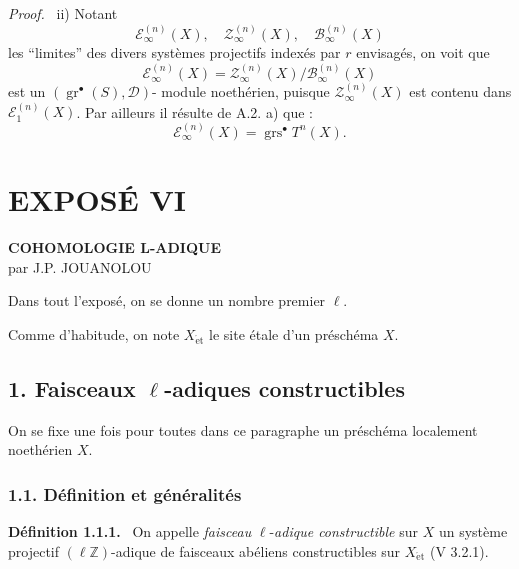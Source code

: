 \documentclass[11pt]{article}
\newenvironment{statement}[1]{\par\medskip\noindent\textbf{#1.}\ }{\par\medskip}
\newenvironment{prooftext}[1][Proof]{\par\noindent\emph{#1.}\ }{\par\medskip}
\providecommand{\gr}{\operatorname{gr}}
\providecommand{\gr}{\operatorname{gr}}
\providecommand{\gr}{\operatorname{gr}}
\providecommand{\grs}{\operatorname{grs}}
\begin{document}
\begin{prooftext}
ii) Notant
\[
\mathcal E_\infty^{(n)}(X),\quad
\mathcal Z_\infty^{(n)}(X),\quad
\mathcal B_\infty^{(n)}(X)
\]
les ``limites'' des divers systèmes projectifs indexés par \(r\) envisagés, on voit que
\[
\mathcal E_\infty^{(n)}(X)=
\mathcal Z_\infty^{(n)}(X)/\mathcal B_\infty^{(n)}(X)
\]
est un \((\gr^\bullet(S),\mathcal D)\)-
module noethérien, puisque \(\mathcal Z_\infty^{(n)}(X)\) est contenu dans \(\mathcal E_1^{(n)}(X)\). Par ailleurs il résulte de A.2. a) que :
\[
\mathcal E_\infty^{(n)}(X)=\grs^\bullet T^n(X).
\]
\end{prooftext}

\renewenvironment{prooftext}[1][Proof]{\par\noindent\emph{#1.}\ }{\par\medskip}
\section*{EXPOSÉ VI}

\begin{center}
\textbf{COHOMOLOGIE L-ADIQUE}\\[0.5em]
par J.P. JOUANOLOU
\end{center}

Dans tout l'exposé, on se donne un nombre premier \(\ell\).

Comme d'habitude, on note \(X_{\mathrm{\acute et}}\) le site étale d'un préschéma \(X\).

\subsection*{1. Faisceaux \(\ell\)-adiques constructibles}

On se fixe une fois pour toutes dans ce paragraphe un préschéma localement noethérien \(X\).

\subsubsection*{1.1. Définition et généralités}

\begin{statement}{Définition 1.1.1}
On appelle \emph{faisceau} \(\ell\)-\emph{adique constructible} sur \(X\) un système projectif \((\ell\mathbb Z)\)-adique de faisceaux abéliens constructibles sur \(X_{\mathrm{\acute et}}\) (V 3.2.1).
\end{statement}
\end{document}
